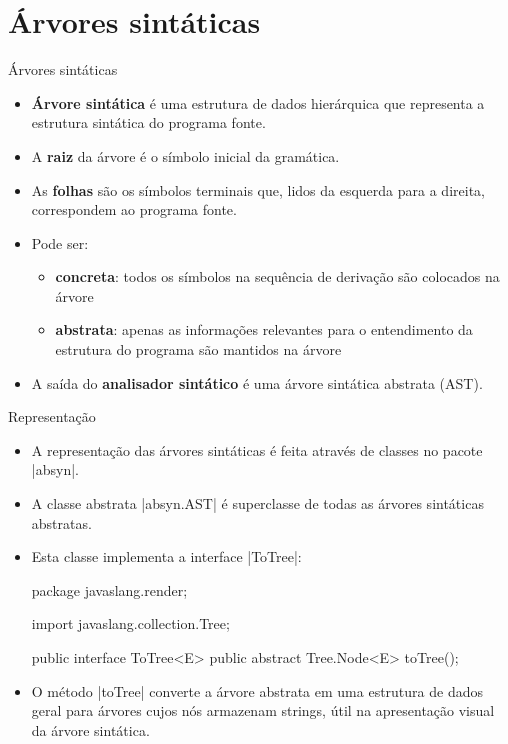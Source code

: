 \section{Árvores sintáticas}

\begin{frame}{Árvores sintáticas}
  \begin{itemize}
    \item \textbf{Árvore sintática} é uma \alert{estrutura de dados
      hierárquica} que representa a estrutura sintática do programa
    fonte.
    \item A \textbf{raiz} da árvore é o \alert{símbolo inicial} da
    gramática.
    \item As \textbf{folhas} são os \alert{símbolos terminais} que,
    lidos da esquerda para a direita, correspondem ao programa fonte.
    \item Pode ser:
    \begin{itemize}
      \item \textbf{concreta}: todos os símbolos na sequência de
      derivação são colocados na árvore
      \item \textbf{abstrata}: apenas as informações relevantes para o
      entendimento da estrutura do programa são mantidos na árvore
    \end{itemize}
    \item A saída do \textbf{analisador sintático} é uma árvore
    sintática abstrata (\alert{AST}).
  \end{itemize}
\end{frame}

\begin{frame}{Representação}
  \begin{itemize}
    \item A representação das árvores sintáticas é feita através de
    classes no pacote \pyginline|absyn|.
    \item A classe abstrata \pyginline|absyn.AST| é superclasse de
    todas as árvores sintáticas abstratas.
    \item Esta classe implementa a interface \pyginline|ToTree|:
\begin{pygmented}[]
package javaslang.render;

import javaslang.collection.Tree;

public interface ToTree<E> {
    public abstract Tree.Node<E> toTree();
}
\end{pygmented}
    \item O método \pyginline|toTree| converte a árvore abstrata em
    uma estrutura de dados geral para árvores cujos nós armazenam
    strings, útil na apresentação visual da árvore sintática.
  \end{itemize}
\end{frame}


